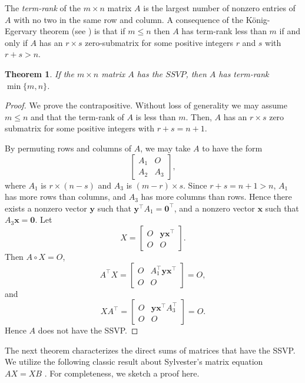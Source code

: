 \documentclass[preprint,12pt]{elsarticle}
\newcommand{\trans  }{^\top}
\newtheorem{theorem}{Theorem}[section]
\begin{document}
The \textit{term-rank} of the $m\times n$ matrix $A$ is the largest number of 
nonzero entries of $A$ with no two in the same row and column.
A consequence of the K\"onig-Egervary theorem (see \cite{BrualdiRyser}) is that
if $m\leq n$ then $A$ has term-rank less than $m$ if and only if $A$
has an $r\times s$ zero-submatrix for some positive integers $r$ and 
$s$ with $r+s>n $.

\begin{theorem}
\label{termrank}
If the $m\times n$ matrix $A$ has the $SSVP$, 
then $A$ has term-rank $\min \{m,n\}$.
\end{theorem}

\begin{proof}
We prove the contrapositive.
Without loss of generality we may assume $m\leq n$ and that the term-rank of  $A$ is less than $m$.
Then, $A$ has an $r\times s$ 
zero submatrix for some positive integers with $r+s =n+1$.

By permuting rows and columns of $A$,  we may take 
$A$ to have the form 
\[
\left[ 
\begin{array}{c|c}
A_1 & O \\ \hline 
A_2 & A_3
\end{array}
\right],
\]
where $A_1$ is $r \times (n-s)$ and $A_3$ is $(m-r) \times s$.
Since $r+s=n+1>n$, $A_1$ has more rows than columns, and $A_3$ has 
more columns than rows.  Hence there exists a nonzero vector $\mathbf y$ such that $\mathbf y\trans A_1=\mathbf 0\trans$,
and a nonzero vector $\mathbf x$ such that $A_3 \mathbf x=\mathbf 0$.
Let 
\[ X =
\left[ 
\begin{array}{c|c} O & \mathbf y \mathbf x\trans 
\\ \hline 
O & O 
\end{array}
\right].
\]
Then 
$A \circ X=O$, 
\[
A\trans X = \left[\begin{array}{c|c} O & A_1\trans \mathbf y \mathbf x\trans \\ \hline O &O \end{array}  \right]= O,
\] 
and 
\[
XA\trans = \left[\begin{array}{c|c} O & \mathbf y \mathbf x\trans A_3\trans \\ \hline O &O \end{array}  \right]= O.
\] 
Hence $A$ does not have the SSVP. 
\end{proof}

The next theorem characterizes the direct sums of matrices that have the  SSVP. We utilize the following classic result about Sylvester's matrix equation $AX=XB$ \cite{Gantmacher}. For completeness, we sketch a proof here.
\end{document}

